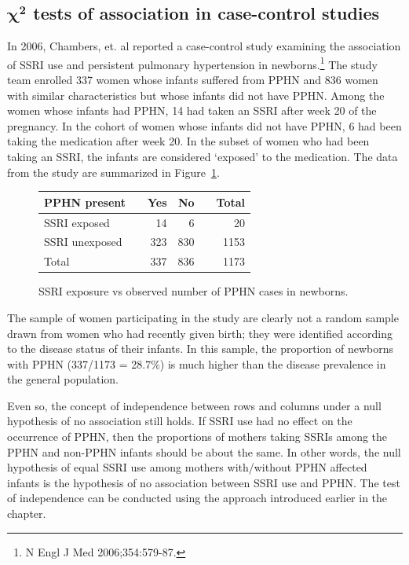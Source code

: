 \textD{\newpage}


\subsection{$\pmb{\chi^2}$ tests of association in case-control studies}
\label{caseControlTests}


In 2006, Chambers, et. al reported a case-control study examining the association of SSRI use and persistent pulmonary hypertension in newborns.\footnote{N Engl J Med 2006;354:579-87.}  The study team enrolled 337 women whose infants suffered from PPHN and 836 women with similar characteristics but whose infants did not have PPHN.  Among the women whose infants had PPHN, 14 had taken an SSRI after week 20 of the pregnancy.  In the cohort of women whose infants did not have PPHN, 6 had been taking the medication after week 20. In the subset of women who had been taking an SSRI, the infants are considered `exposed' to the medication. The data from the study are summarized in Figure~\ref{ssriPPHNObserved}.

\begin{figure}[h]
	\centering
	\begin{tabular}{ll rrr r}
		\hline
		PPHN present	 & \hspace{2mm} & Yes & No & \hspace{2mm} & Total \\
		\hline
		SSRI exposed &	& 14 & 6 &  & 20  \\
		SSRI unexposed & & 323 & 830 &  & 1153  \\
        Total & & 337 & 836 & & 1173 \\
		\hline
	\end{tabular}
	\caption{SSRI exposure vs observed number of PPHN cases in newborns.}
    \label{ssriPPHNObserved}
\end{figure}

The sample of women participating in the study are clearly not a random sample drawn from women who had recently given birth; they were identified according to the disease status of their infants.  In this sample, the proportion of newborns with PPHN (337/1173 = 28.7\%) is much higher than the disease prevalence in the general population.

Even so, the concept of independence between rows and columns under a null hypothesis of no association still holds. If SSRI use had no effect on the occurrence of PPHN, then the proportions of mothers taking SSRIs among the PPHN and non-PPHN infants should be about the same. In other words, the null hypothesis of equal SSRI use among mothers with/without PPHN affected infants is the hypothesis of no association between SSRI use and PPHN. The test of independence can be conducted using the approach introduced earlier in the chapter.

